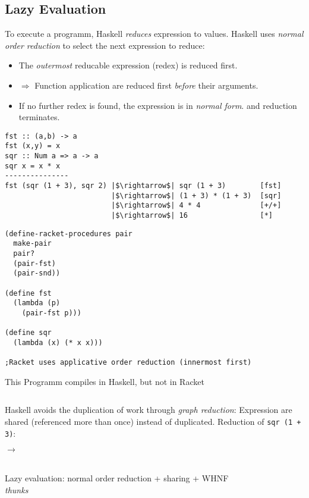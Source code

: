 \documentclass{article}
\newcommand{\Haskell}[1]{\texttt{#1}}
\begin{document}
\subsection{Lazy Evaluation}
To execute a programm, Haskell \emph{reduces} expression to values. Haskell uses \emph{normal order reduction} to select the next expression to reduce:
\begin{itemize}
\item The \emph{outermost} reducable expression (redex) is reduced first.
\item $\Rightarrow$ Function application are reduced first \emph{before} their arguments.
\item If no further redex is found, the expression is in \emph{normal form}. and reduction terminates.
\end{itemize}
\begin{verbatim}
fst :: (a,b) -> a
fst (x,y) = x
sqr :: Num a => a -> a
sqr x = x * x
---------------
fst (sqr (1 + 3), sqr 2) |$\rightarrow$| sqr (1 + 3)        [fst]
                         |$\rightarrow$| (1 + 3) * (1 + 3)  [sqr]
                         |$\rightarrow$| 4 * 4              [+/+]
                         |$\rightarrow$| 16                 [*]
\end{verbatim}
\begin{verbatim}
(define-racket-procedures pair
  make-pair
  pair?
  (pair-fst)
  (pair-snd))

(define fst
  (lambda (p)
    (pair-fst p)))

(define sqr 
  (lambda (x) (* x x)))

;Racket uses applicative order reduction (innermost first)
\end{verbatim}
\begin{listing}[h!]
\caption{This Programm compiles in Haskell, but not in Racket}
\inputminted[]{Haskell}{bomb.hs}
\end{listing}
Haskell avoids the duplication of work through \emph{graph reduction}: Expression are shared (referenced more than once) instead of duplicated. Reduction of \Haskell{sqr (1 + 3)}:\\
$\rightarrow$
\\
Lazy evaluation: normal order reduction + sharing + WHNF\\
\emph{thunks}
\end{document}
